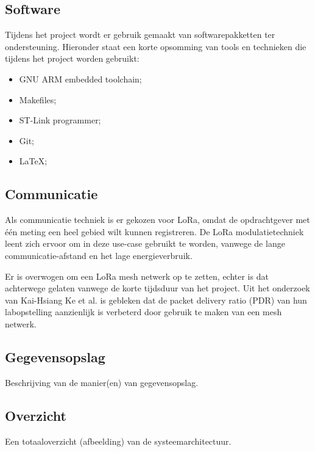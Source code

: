 \subsection{Software}
Tijdens het project wordt er gebruik gemaakt van softwarepakketten ter ondersteuning. Hieronder staat een korte opsomming van tools en technieken die tijdens het project worden gebruikt:
\begin{itemize}
    \item GNU ARM embedded toolchain;
    \item Makefiles;
    \item ST-Link programmer;
    \item Git;
    \item \LaTeX;
\end{itemize}

\subsection{Communicatie}
Als communicatie techniek is er gekozen voor LoRa, omdat de opdrachtgever met één meting een heel gebied wilt kunnen registreren. De LoRa modulatietechniek leent zich ervoor om in deze use-case gebruikt te worden, vanwege de lange communicatie-afstand en het lage energieverbruik.

Er is overwogen om een LoRa mesh netwerk op te zetten, echter is dat achterwege gelaten vanwege de korte tijdsduur van het project. Uit het onderzoek van Kai-Hsiang Ke et al. is gebleken dat de packet delivery ratio (PDR) van hun labopstelling aanzienlijk is verbeterd door gebruik te maken van een mesh netwerk.

\subsection{Gegevensopslag}
Beschrijving van de manier(en) van gegevensopslag.

\label{subsec:overzicht}
\subsection{Overzicht}
Een totaaloverzicht (afbeelding) van de systeemarchitectuur.
